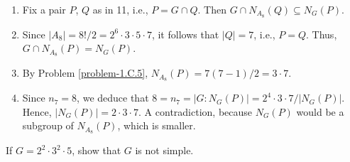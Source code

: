 \begin{solution}
\begin{enumerate}[\upshape1.]
    \item Fix a pair $P$, $Q$ as in 11, i.e., $P=G\cap Q$. Then $G\cap N_{A_8}(Q)\subseteq N_G(P)$.
    \item Since $|A_8|=8!/2 = 2^6\cdot3\cdot5\cdot7$, it follows that $|Q|=7$, i.e., $P=Q$. Thus, $G\cap N_{A_8}(P)=N_G(P)$.
    \item By Problem \ref{problem-1.C.5}, $N_{A_8}(P)=7(7-1)/2=3\cdot7$.
    \item Since $n_7=8$, we deduce that $8=n_7=|G:N_G(P)|=2^4\cdot3\cdot7/|N_G(P)|$. Hence, $|N_G(P)|=2\cdot3\cdot7$. A contradiction, because $N_G(P)$ would be a subgroup of $N_{A_8}(P)$, which is smaller.
\end{enumerate}
\end{solution}

\begin{probl}
    If\/ $G=2^2\cdot3^2\cdot5$, show that\/ $G$ is not simple.
\end{probl}

